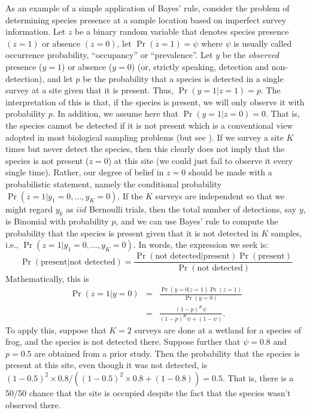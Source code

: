 As an example of a simple application of Bayes' rule,
consider the problem of determining species presence at a sample
location based on imperfect survey information. Let $z$ be a binary
random variable that denotes species presence $(z=1)$ or absence
$(z=0)$, let $\Pr(z=1) = \psi$ where $\psi$ is usually called
occurrence probability, ``occupancy'' \citep{mackenzie_etal:2002} or ``prevalence''.
Let $y$ be the {\it observed} presence
($y=1$) or absence ($y=0$) (or, strictly speaking, detection and non-detection), and let $p$ be the probability that a
species is detected in a single survey at a site given that it is
present. Thus, $\Pr(y=1|z=1)=p$. The interpretation of this is that,
if the species is present, we will only observe it with
probability $p$. In addition, we assume here that $\Pr(y=1|z=0) =
0$. That is, the species cannot be detected if it is not present which
is a conventional view adopted in most biological sampling problems (but
see \citet{royle_link:2006}).
If we survey a site $K$ times but never detect the species,
then this clearly does not imply that the species is not present
($z=0$) at this site (we could just fail to observe it every single time). Rather, our degree of belief in $z=0$ should be
made with a probabilistic statement, namely the conditional probability
$\Pr(z=1|y_1=0,\ldots,y_{K}=0)$. If the $K$ surveys are independent so
that we might regard $y_{k}$ as $iid$ Bernoulli trials, then the total
number of detections, say $y$, is Binomial with probability $p$, and
we can use Bayes' rule to compute the probability that the species is present
given that it is not detected in $K$ samples, i.e., $\Pr(z=1|y_{1} =
0, \ldots, y_{K} = 0)$. In words, the expression
we seek is:
\[
\Pr(\mbox{present} | \mbox{not detected}) = \frac{\Pr(\mbox{not detected} |
  \mbox{present})\Pr(\mbox{present})}{\Pr(\mbox{not detected})}
\]
Mathematically, this is
\begin{eqnarray*}
\Pr(z=1|y=0) &= &\frac{\Pr(y=0|z=1)\Pr(z=1)}{\Pr(y=0) } \\
             &= & \frac{(1-p)^{K} \psi}{ (1-p)^K \psi + (1-\psi) }.
\end{eqnarray*}
To apply this,
suppose that $K=2$ surveys are done at a wetland for a species of
frog, and the species is not detected there. Suppose further that $\psi
= 0.8$ and $p = 0.5$ are obtained from a prior study.  Then the
probability that the species is present at this site, even though it
was not detected, is
$(1-0.5)^2 \times 0.8/((1-0.5)^2 \times 0.8 + (1-0.8)) = 0.5$. 
That is, there is a
50/50 chance that the site is occupied despite the fact that the
species wasn't observed there.


